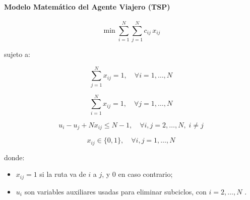 \documentclass[12pt,titlepage,twoside,openright]{book}
\begin{document}
\paragraph{Modelo Matemático del Agente Viajero (TSP)}

\begin{equation}
	\min \sum_{i=1}^N \sum_{j=1}^N c_{ij}\,x_{ij}
	\label{eq:TSP_obj}
\end{equation}

sujeto a:

\begin{equation}
	\sum_{j=1}^N x_{ij} = 1, \quad \forall i = 1,\dots,N
	\label{eq:TSP_out}
\end{equation}

\begin{equation}
	\sum_{i=1}^N x_{ij} = 1, \quad \forall j = 1,\dots,N
	\label{eq:TSP_in}
\end{equation}

\begin{equation}
	u_i - u_j + N x_{ij} \leq N - 1, \quad \forall i,j = 2,\dots,N, \; i \neq j
	\label{eq:TSP_subtour}
\end{equation}

\begin{equation}
	x_{ij} \in \{0,1\}, \quad \forall i,j = 1,\dots,N
	\label{eq:TSP_bin}
\end{equation}

\medskip

\noindent donde:
\begin{itemize}
    \item \(x_{ij} = 1\) si la ruta va de \(i\) a \(j\), y 0 en caso contrario;
    \item \(u_i\) son variables auxiliares usadas para eliminar subciclos, con \(i=2,\dots,N\) \citep{torres2018}.
\end{itemize}
\end{document}
